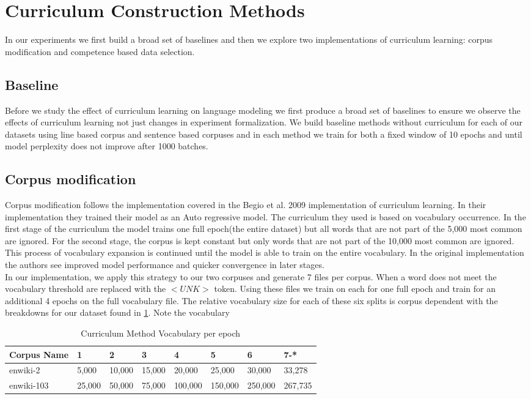 \section{Curriculum Construction Methods}
In our experiments we first build a broad set of baselines and then we explore two implementations of curriculum learning: corpus modification and competence based data selection. 
\subsection{Baseline}
Before we study the effect of curriculum learning on language modeling we first produce a broad set of baselines to ensure we observe the effects of curriculum learning not just changes in experiment formalization. We build baseline methods without curriculum for each of our datasets using line based corpus and sentence based corpuses and in each method we train for both a fixed window of 10 epochs and until model perplexity does not improve after 1000 batches. 
\subsection{Corpus modification}
Corpus modification follows the implementation covered in the Begio et al. 2009 \cite{Bengio2009CurriculumL} implementation of curriculum learning. In their implementation they trained their model as an Auto regressive model. The curriculum they used is based on vocabulary occurrence. In the first stage of the curriculum the model trains one full epoch(the entire dataset) but all words that are not part of the 5,000 most common are ignored. For the second stage, the corpus is kept constant but only words that are not part of the 10,000 most common are ignored. This process of vocabulary expansion is continued until the model is able to train on the entire vocabulary. In the original implementation the authors see improved model performance and quicker convergence in later stages. \\
In our implementation, we apply this strategy to our two corpuses and generate 7 files per corpus. When a word does not meet the vocabulary threshold are replaced with the $<UNK>$ token. Using these files we train on each for one full epoch and train for an additional 4 epochs on the full vocabulary file. The relative vocabulary size for each of these six splits is corpus dependent with the breakdowns for our dataset found in \ref{table:2}. Note the vocabulary 
\begin{table}[h!]
\begin{tabular}{|l|l|l|l|l|l|l|l|} \hline
\textbf{Corpus Name} & \textbf{1} & \textbf{2} & \textbf{3} & \textbf{4} & \textbf{5} & \textbf{6} & \textbf{7-*}  \\ \hline
enwiki-2 & 5,000 & 10,000 & 15,000 & 20,000 & 25,000 & 30,000 & 33,278 \\ \hline
enwiki-103 & 25,000 & 50,000 & 75,000 & 100,000 & 150,000  & 250,000 & 267,735\\ \hline
\end{tabular}
\caption{Curriculum Method Vocabulary per epoch}
\label{table:2}
\end{table}
